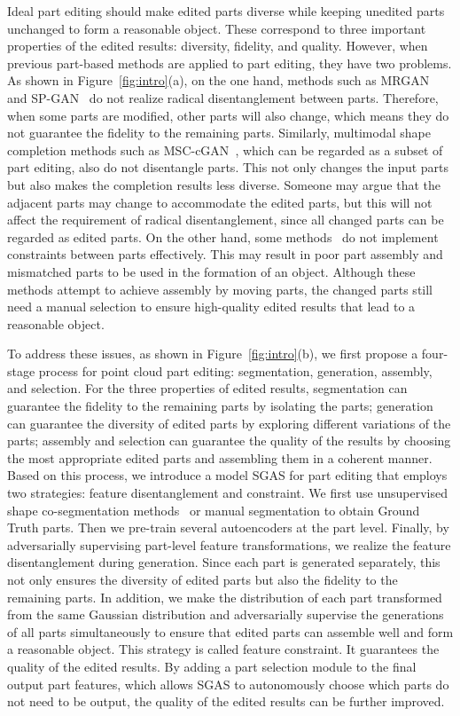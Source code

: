 \documentclass[letterpaper]{article} %
\begin{document}
Ideal part editing should make edited parts diverse while keeping unedited parts unchanged to form a reasonable object. These correspond to three important properties of the edited results: diversity, fidelity, and quality. However, when previous part-based methods are applied to part editing, they have two problems. As shown in Figure~\ref{fig:intro}(a), on the one hand, methods such as MRGAN~\citep{Gal_2021_ICCV} and SP-GAN~\citep{li2021spgan} do not realize radical disentanglement between parts. Therefore, when some parts are modified, other parts will also change, which means they do not guarantee the fidelity to the remaining parts. Similarly, multimodal shape completion methods such as MSC-cGAN~\citep{wu2020multimodal}, which can be regarded as a subset of part editing, also do not disentangle parts. This not only changes the input parts but also makes the completion results less diverse. Someone may argue that the adjacent parts may change to accommodate the edited parts, but this will not affect the requirement of radical disentanglement, since all changed parts can be regarded as edited parts. On the other hand, some methods~\citep{Schor_2019_ICCV,Li_Niu_Xu_2020,Li_Liu_Walder_2022} do not implement constraints between parts effectively. This may result in poor part assembly and mismatched parts to be used in the formation of an object. Although these methods attempt to achieve assembly by moving parts, the changed parts still need a manual selection to ensure high-quality edited results that lead to a reasonable object.

To address these issues, as shown in Figure~\ref{fig:intro}(b), we first propose a four-stage process for point cloud part editing: segmentation, generation, assembly, and selection. For the three properties of edited results, segmentation can guarantee the fidelity to the remaining parts by isolating the parts; generation can guarantee the diversity of edited parts by exploring different variations of the parts; assembly and selection can guarantee the quality of the results by choosing the most appropriate edited parts and assembling them in a coherent manner. Based on this process, we introduce a model SGAS for part editing that employs two strategies: feature disentanglement and constraint. We first use unsupervised shape co-segmentation methods~\citep{Chen_2019_ICCV,Zhu_2020_CVPR,Zhang_Yang_Wu_Jin_2022} or manual segmentation to obtain Ground Truth parts. Then we pre-train several autoencoders at the part level. Finally, by adversarially supervising part-level feature transformations, we realize the feature disentanglement during generation. Since each part is generated separately, this not only ensures the diversity of edited parts but also the fidelity to the remaining parts. In addition, we make the distribution of each part transformed from the same Gaussian distribution and adversarially supervise the generations of all parts simultaneously to ensure that edited parts can assemble well and form a reasonable object. This strategy is called feature constraint. It guarantees the quality of the edited results. By adding a part selection module to the final output part features, which allows SGAS to autonomously choose which parts do not need to be output, the quality of the edited results can be further improved.
\end{document}
